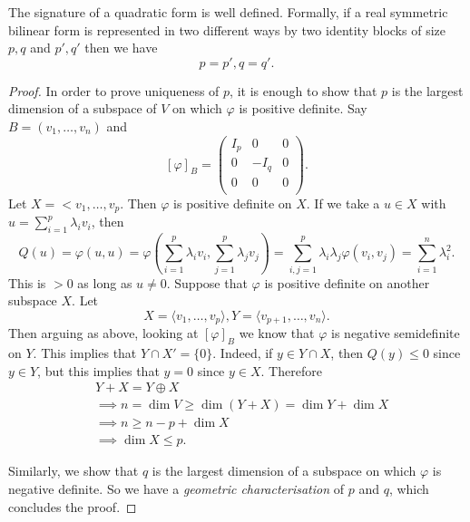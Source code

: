\documentclass[a4paper]{scrartcl}
\begin{document}
\begin{theorem}
    The signature of a quadratic form is well defined. \newline 
     Formally, if a real symmetric bilinear form is represented in two different ways by two identity blocks of size $p,q$ and $p',q'$ then we have 
     \[p=p',q=q'.\]
\end{theorem}
\begin{proof}
     In order to prove uniqueness of $p$, it is enough to show that $p$ is the largest dimension of a subspace of $V$ on which $\varphi $ is positive definite. Say $B=(v_1, \ldots , v_n)$ and 
     \[[\varphi]_B=\left(
          \begin{array}{c|c|c}
           I_p &0&0\\
           \hline
           0 &-I_q&0\\
           \hline
           0 &0&0\\
           \end{array}
           \right).\]
     Let $X=<v_1,\ldots ,v_p$. Then $\varphi $ is positive definite on $X$. If we take a $u \in X$ with $u=\sum_{i=1}^{p}\lambda_i v_i$, then 
     \[Q(u)= \varphi (u,u)=\varphi(\sum_{i=1}^{p}\lambda_i v_i,\sum_{j=1}^{p}\lambda_j v_j)=\sum_{i,j=1}^{p}\lambda_i \lambda_j \varphi (v_i,v_j)= \sum_{i=1}^{n} \lambda_i^2 .\]
     This is $>0$ as long as $u \neq 0$. Suppose that $\varphi $ is positive definite on another subspace $X$. Let 
     \[X=\langle v_1,\ldots ,v_p \rangle  , Y=\langle v_{p+1},\ldots ,v_n \rangle .\]
     Then arguing as above, looking at $[\varphi]_B$ we know that $\varphi$ is negative semidefinite on $Y$. This implies that 
     $Y \cap X'=\{0\}$. Indeed, if $y \in Y \cap X$, then $Q(y)\leq 0$ since $y \in Y$, but this implies that $y=0$ since $y \in X$. Therefore 
     \begin{align*}
          &Y+X= Y \oplus X\\
          &\implies n=\operatorname{dim} V \geq \operatorname{dim} (Y+X) =\operatorname{dim}Y +\operatorname{dim}X\\
          &\implies n \geq n-p+\operatorname{dim}X\\
          &\implies \operatorname{dim}X \leq p.
     \end{align*}
     
     Similarly, we show that $q$ is the largest dimension of a subspace on which $\varphi$ is negative definite. So we have a \emph{geometric characterisation} of $p$ and $q$, which concludes the proof.
\end{proof}
\end{document}
